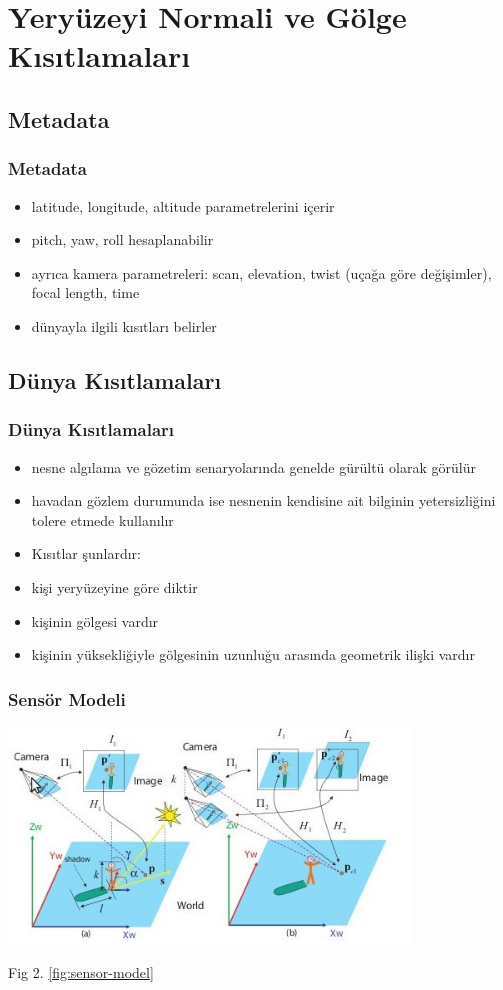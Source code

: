 \documentclass{beamer}
\begin{document}
\section{Yeryüzeyi Normali ve Gölge Kısıtlamaları}

\subsection{Metadata}

\begin{frame}
	\frametitle{Metadata}

	\begin{itemize}
		\item latitude, longitude, altitude parametrelerini içerir
		\item pitch, yaw, roll hesaplanabilir
		\item ayrıca kamera parametreleri: scan, elevation, twist (uçağa göre
			  değişimler), focal length, time
		\item dünyayla ilgili kısıtları belirler
	\end{itemize}
\end{frame}

\subsection{Dünya Kısıtlamaları}

\begin{frame}
	\frametitle{Dünya Kısıtlamaları}

	\begin{itemize}
		\item nesne algılama ve gözetim senaryolarında genelde gürültü olarak görülür
		\item havadan gözlem durumunda ise nesnenin kendisine ait bilginin
			  yetersizliğini tolere etmede kullanılır
		\item Kısıtlar şunlardır:
		\item kişi yeryüzeyine göre diktir
		\item kişinin gölgesi vardır
		\item kişinin yüksekliğiyle gölgesinin uzunluğu arasında geometrik
		ilişki vardır
	\end{itemize}
\end{frame}

\begin{frame}
	\frametitle{Sensör Modeli}

	\includegraphics[width=0.8\textwidth]{img/fig2.jpg}

	Fig 2. \ref{fig:sensor-model}
\end{frame}
\end{document}
